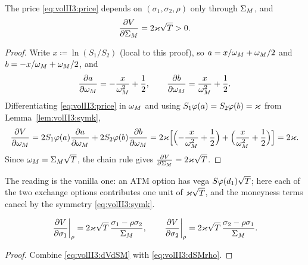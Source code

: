 \begin{proposition}
\label{prop:volII3:dVdSM}
The price \eqref{eq:volII3:price} depends on $(\sigma_1, \sigma_2, \rho)$ only
through $\Sigma_M$, and
\begin{equation}\label{eq:volII3:dVdSM}
\frac{\partial V}{\partial \Sigma_M} = 2\varkappa\sqrt{T} > 0 .
\end{equation}
\end{proposition}

\begin{proof}
Write $x \coloneqq \ln(S_1/S_2)$ (local to this proof), so
$a = x/\omega_M + \omega_M/2$ and $b = -x/\omega_M + \omega_M/2$, and
\begin{equation}\label{eq:volII3:dadom}
\frac{\partial a}{\partial \omega_M} = -\frac{x}{\omega_M^2} + \frac12, \qquad
\frac{\partial b}{\partial \omega_M} = \frac{x}{\omega_M^2} + \frac12 .
\end{equation}
Differentiating \eqref{eq:volII3:price} in $\omega_M$ and using
$S_1\varphi(a) = S_2\varphi(b) = \varkappa$ from Lemma~\ref{lem:volII3:symk},
\begin{equation}\label{eq:volII3:dVdom}
\frac{\partial V}{\partial \omega_M}
= 2S_1\varphi(a)\frac{\partial a}{\partial \omega_M} + 2S_2\varphi(b)\frac{\partial b}{\partial \omega_M}
= 2\varkappa\Bigl[\Bigl(-\frac{x}{\omega_M^2} + \frac12\Bigr)
            + \Bigl(\frac{x}{\omega_M^2} + \frac12\Bigr)\Bigr]
= 2\varkappa .
\end{equation}
Since $\omega_M = \Sigma_M\sqrt{T}$, the chain rule gives
$\frac{\partial V}{\partial \Sigma_M} = 2\varkappa\sqrt{T}$.
\end{proof}

The reading is the vanilla one: an ATM option has vega $S\varphi(d_1)\sqrt{T}$;
here each of the two exchange options contributes one unit of $\varkappa\sqrt{T}$,
and the moneyness terms cancel by the symmetry \eqref{eq:volII3:symk}.

\begin{proposition}\label{prop:volII3:vegarho}
\begin{equation}\label{eq:volII3:vegarho}
\left.\frac{\partial V}{\partial \sigma_1}\right|_{\rho}
= 2\varkappa\sqrt{T}\,\frac{\sigma_1 - \rho\sigma_2}{\Sigma_M},
\qquad
\left.\frac{\partial V}{\partial \sigma_2}\right|_{\rho}
= 2\varkappa\sqrt{T}\,\frac{\sigma_2 - \rho\sigma_1}{\Sigma_M}.
\end{equation}
\end{proposition}

\begin{proof}
Combine \eqref{eq:volII3:dVdSM} with \eqref{eq:volII3:dSMrho}.
\end{proof}

